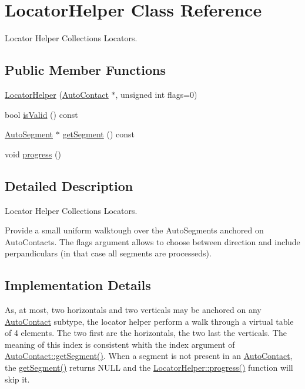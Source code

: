 \hypertarget{classKatabatic_1_1LocatorHelper}{}\section{Locator\+Helper Class Reference}
\label{classKatabatic_1_1LocatorHelper}


Locator Helper Collection\textquotesingle{}s Locators.  


\subsection*{Public Member Functions}
\begin{DoxyCompactItemize}
\item 
\mbox{\hyperlink{classKatabatic_1_1LocatorHelper_af44c2fcc73d387e3e3b5c334f25b070b}{Locator\+Helper}} (\mbox{\hyperlink{classKatabatic_1_1AutoContact}{Auto\+Contact}} $\ast$, unsigned int flags=0)
\item 
bool \mbox{\hyperlink{classKatabatic_1_1LocatorHelper_a5bc2a781be2586924afce4e4a4ea6697}{is\+Valid}} () const
\item 
\mbox{\hyperlink{classKatabatic_1_1AutoSegment}{Auto\+Segment}} $\ast$ \mbox{\hyperlink{classKatabatic_1_1LocatorHelper_ad0f8becc4187c833b6f6c5f902f8aaa5}{get\+Segment}} () const
\item 
void \mbox{\hyperlink{classKatabatic_1_1LocatorHelper_a1be98ae64bededebc29a04f257024ebe}{progress}} ()
\end{DoxyCompactItemize}


\subsection{Detailed Description}
Locator Helper Collection\textquotesingle{}s Locators. 

Provide a small uniform walktough over the Auto\+Segments anchored on Auto\+Contacts. The {\ttfamily flags} argument allows to choose between direction and include perpandiculars (in that case all segments are processeds).\hypertarget{classKatabatic_1_1LocatorHelper_secLocHelperImplementation}{}\subsection{Implementation Details}\label{classKatabatic_1_1LocatorHelper_secLocHelperImplementation}
As, at most, two horizontals and two verticals may be anchored on any \mbox{\hyperlink{classKatabatic_1_1AutoContact}{Auto\+Contact}} subtype, the locator helper perform a walk through a virtual table of 4 elements. The two first are the horizontals, the two last the verticals. The meaning of this index is consistent whith the {\ttfamily index} argument of \mbox{\hyperlink{classKatabatic_1_1AutoContact_a50531ded68cc5206fe104b8d8bf3bd87}{Auto\+Contact\+::get\+Segment()}}. When a segment is not present in an \mbox{\hyperlink{classKatabatic_1_1AutoContact}{Auto\+Contact}}, the {\ttfamily \mbox{\hyperlink{classKatabatic_1_1LocatorHelper_ad0f8becc4187c833b6f6c5f902f8aaa5}{get\+Segment()}}} returns {\ttfamily N\+U\+LL} and the \mbox{\hyperlink{classKatabatic_1_1LocatorHelper_a1be98ae64bededebc29a04f257024ebe}{Locator\+Helper\+::progress()}} function will skip it.

